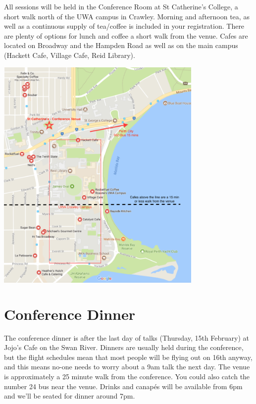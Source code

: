 \documentclass[]{article}
\begin{document}
All sessions will be held in the Conference Room at St Catherine's
College, a short walk north of the UWA campus in Crawley. Morning and
afternoon tea, as well as a continuous supply of tea/coffee is included
in your registration. There are plenty of options for lunch and coffee a
short walk from the venue. Cafes are located on Broadway and the Hampden
Road as well as on the main campus (Hackett Cafe, Village Cafe, Reid
Library).

\begin{center}
\vspace{0.5 cm}
\includegraphics[width=10cm]{images/Venue}
\vspace{0.5 cm}
\end{center}

\newpage

\section{Conference Dinner}\label{conference-dinner}

The conference dinner is after the last day of talks (Thursday, 15th
February) at Jojo's Cafe on the Swan River. Dinners are usually held
during the conference, but the flight schedules mean that most people
will be flying out on 16th anyway, and this means no-one needs to worry
about a 9am talk the next day. The venue is approximately a 25 minute
walk from the conference. You could also catch the number 24 bus near
the venue. Drinks and canapés will be available from 6pm and we'll be
seated for dinner around 7pm.
\end{document}
